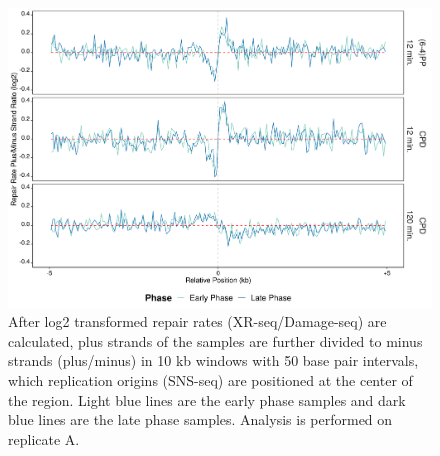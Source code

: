\begin{figure}[H]
\begin{center}
\includegraphics[width=\textwidth]{Chapters/7_appendix/figures/supfig58}
\caption[Repair rate plus/minus ratio of replication origins in 10 kb (replicate A).]{After log2 transformed repair rates (XR-seq/Damage-seq) are calculated, plus strands of the samples are further divided to minus strands (plus/minus) in 10 kb windows with 50 base pair intervals, which replication origins (SNS-seq) are positioned at the center of the region. Light blue lines are the early phase samples and dark blue lines are the late phase samples. Analysis is performed on replicate A.}
\label{supfig:rrpm10snsA}
\end{center}
\end{figure}

